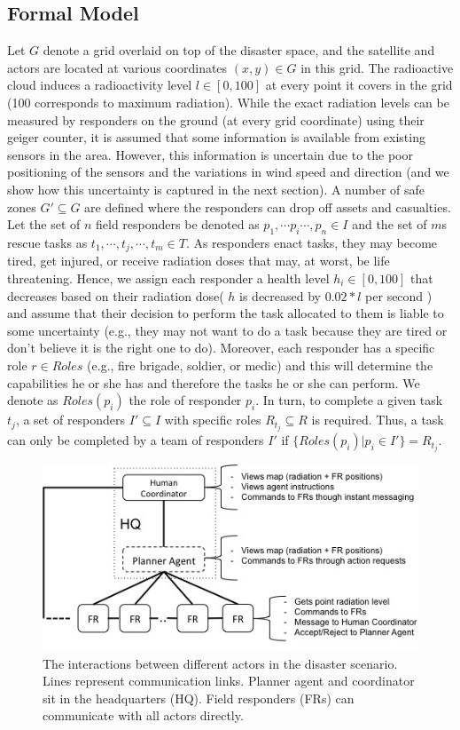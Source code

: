 \subsection{Formal Model}
\noindent Let $G$ denote a grid overlaid on top of the disaster space, and the satellite and actors are located at various coordinates $(x,y) \in G$ in this grid. The radioactive cloud induces a radioactivity level  $l \in [0,100]$ at every point it covers in the grid (100 corresponds to maximum radiation). While the exact radiation levels can be measured by responders on the ground (at every grid coordinate) using their geiger counter, it is assumed that some information is available  from existing sensors  in the area. However, this information is uncertain due to the poor positioning of the sensors and the variations in wind speed and direction (and we show how this uncertainty is captured in the next section). A number of safe zones $G' \subseteq G$ are defined where the responders can drop off assets and casualties. Let the set of $n$ field responders be denoted as $p_1, \cdots p_i \cdots, p_n \in I$ and the set of $m$s rescue tasks as  $t_1,\cdots, t_j, \cdots, t_m\in T$.  As responders enact tasks, they may become tired, get injured, or receive radiation doses that may, at worst, be life threatening. Hence, we assign each responder  a health level $h_i\in [0,100]$ that decreases based on their radiation dose( $h$ is decreased by $0.02 * l $ per second ) and assume that their decision to perform the task allocated to them is liable to some uncertainty (e.g., they may not want to do a task because they are tired or don't believe it is the right one to do).  Moreover, each responder has  a specific role  $r \in Roles$ (e.g., fire brigade, soldier, or medic) and this will determine the capabilities he or she has and therefore the tasks he or she can perform. We denote as $Roles(p_i)$ the role of responder $p_i$. In turn, to complete a given task $t_j$,  a set of responders $I' \subseteq I$ with specific roles $R_{t_j} \subseteq R$ is required. Thus, a task can only be completed by a team of responders $I'$ if $\{Roles(p_i) | p_i \in I'\} = R_{t_j}$. 
\begin{figure}[htbp]
\includegraphics[width=\columnwidth]{scenario.jpg}\vspace{-5mm}

\label{fig:scenario}
\caption{The interactions between different actors in the disaster scenario. Lines represent communication links. Planner agent and coordinator sit in the headquarters (HQ). Field responders (FRs) can communicate with all actors directly.}\end{figure}
